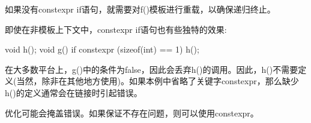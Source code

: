 如果没有constexpr if语句，就需要对f()模板进行重载，以确保递归终止。

即使在非模板上下文中，constexpr if语句也有些独特的效果:

\begin{cpp}
void h();
void g() {
	if constexpr (sizeof(int) == 1) {
		h();
	}
}
\end{cpp}

在大多数平台上，g()中的条件为false，因此会丢弃h()的调用。因此，h()不需要定义(当然，除非在其他地方使用)。如果本例中省略了关键字constexpr，那么缺少h()的定义通常会在链接时引起错误。

\begin{notice}优化可能会掩盖错误。如果保证不存在问题，则可以使用constexpr。
\end{notice}























